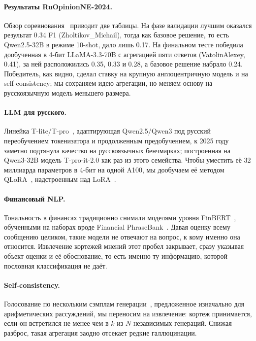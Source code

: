 \documentclass[11pt]{article}
\begin{document}
\paragraph{Результаты RuOpinionNE-2024.}
Обзор соревнования~\cite{ruopinionne2024} приводит две таблицы. На фазе валидации лучшим оказался результат
0.34 F1 (Zholtikov\_Michail), тогда как базовое решение, то есть Qwen2.5-32B в режиме 10-shot, дало лишь 0.17.
На финальном тесте победила дообученная в 4-бит LLaMA-3.3-70B с агрегацией пяти ответов (VatolinAlexey, 0.41),
за ней расположились 0.35, 0.33 и 0.28, а базовое решение набрало 0.24. Победитель, как видно, сделал ставку
на крупную англоцентричную модель и на self-consistency; мы сохраняем идею агрегации, но меняем основу на
русскоязычную модель меньшего размера.

\paragraph{LLM для русского.}
Линейка T-lite/T-pro~\cite{tpro2025}, адаптирующая Qwen2.5/Qwen3 под русский переобучением токенизатора и
продолженным предобучением, к 2025 году заметно подтянула качество на русскоязычных бенчмарках; построенная
на Qwen3-32B модель T-pro-it-2.0 как раз из этого семейства. Чтобы уместить её 32 миллиарда параметров в
4-бит на одной A100, мы дообучаем её методом QLoRA~\cite{qlora2023}, надстроенным над LoRA~\cite{lora2021}.

\paragraph{Финансовый NLP.}
Тональность в финансах традиционно снимали моделями уровня FinBERT~\cite{finbert2019}, обученными на наборах
вроде Financial PhraseBank~\cite{phrasebank2014}. Давая оценку всему сообщению целиком, такие модели не отвечают
на вопрос, к кому именно она относится. Извлечение кортежей мнений этот пробел закрывает, сразу указывая объект
оценки и её обоснование, то есть именно ту информацию, которой пословная классификация не даёт.

\paragraph{Self-consistency.}
Голосование по нескольким сэмплам генерации~\cite{selfconsistency2022}, предложенное изначально для арифметических
рассуждений, мы переносим на извлечение: кортеж принимается, если он встретился не менее чем в $k$ из $N$ независимых
генераций. Снижая разброс, такая агрегация заодно отсекает редкие галлюцинации.
\end{document}
